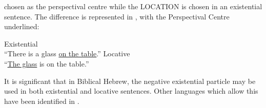 ﻿\documentclass[output=paper]{langsci/langscibook}
\begin{document}
chosen as the perspectival centre while the LOCATION is chosen in an
existential sentence. The difference is represented in
,
with the Perspectival Centre underlined:
%
\begin{exe}\ex \label{ex:heb-eng-glass}
 \begin{xlist}
 \ex Existential    \\
 ``There is a glass \underline{on the table}.'' 
   \ex Locative \\
  ``\underline{The glass} is on the table.''
   \end{xlist}\end{exe}
%
It is significant that in Biblical Hebrew, the negative existential
particle may be used in both existential and locative sentences. Other
languages which allow this have been identified in \textcite{Veselinova2013}.
\end{document}
